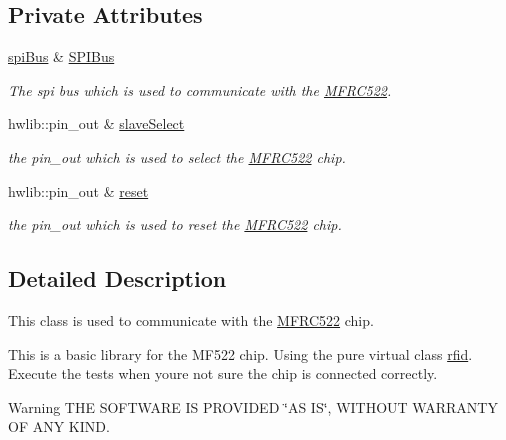 \subsection*{Private Attributes}
\begin{DoxyCompactItemize}
\item 
\mbox{\hyperlink{classspi_bus}{spi\+Bus}} \& \mbox{\hyperlink{class_m_f_r_c522_a76b0186fcad01aafd3d7d7ae4da6a68c}{S\+P\+I\+Bus}}
\begin{DoxyCompactList}\small\item\em The spi bus which is used to communicate with the \mbox{\hyperlink{class_m_f_r_c522}{M\+F\+R\+C522}}. \end{DoxyCompactList}\item 
\mbox{\label{class_m_f_r_c522_ab945c275a8644e226def9f3eee6698a2}} 
hwlib\+::pin\+\_\+out \& \mbox{\hyperlink{class_m_f_r_c522_ab945c275a8644e226def9f3eee6698a2}{slave\+Select}}
\begin{DoxyCompactList}\small\item\em the pin\+\_\+out which is used to select the \mbox{\hyperlink{class_m_f_r_c522}{M\+F\+R\+C522}} chip. \end{DoxyCompactList}\item 
\mbox{\label{class_m_f_r_c522_a924c7dced5cb615461a0c9f353076407}} 
hwlib\+::pin\+\_\+out \& \mbox{\hyperlink{class_m_f_r_c522_a924c7dced5cb615461a0c9f353076407}{reset}}
\begin{DoxyCompactList}\small\item\em the pin\+\_\+out which is used to reset the \mbox{\hyperlink{class_m_f_r_c522}{M\+F\+R\+C522}} chip. \end{DoxyCompactList}\end{DoxyCompactItemize}


\subsection{Detailed Description}
This class is used to communicate with the \mbox{\hyperlink{class_m_f_r_c522}{M\+F\+R\+C522}} chip. 

This is a basic library for the M\+F522 chip. Using the pure virtual class \mbox{\hyperlink{classrfid}{rfid}}. Execute the tests when you\textquotesingle{}re not sure the chip is connected correctly. \begin{DoxyWarning}{Warning}
T\+HE S\+O\+F\+T\+W\+A\+RE IS P\+R\+O\+V\+I\+D\+ED \char`\"{}\+A\+S I\+S\char`\"{}, W\+I\+T\+H\+O\+UT W\+A\+R\+R\+A\+N\+TY OF A\+NY K\+I\+ND. 
\end{DoxyWarning}


